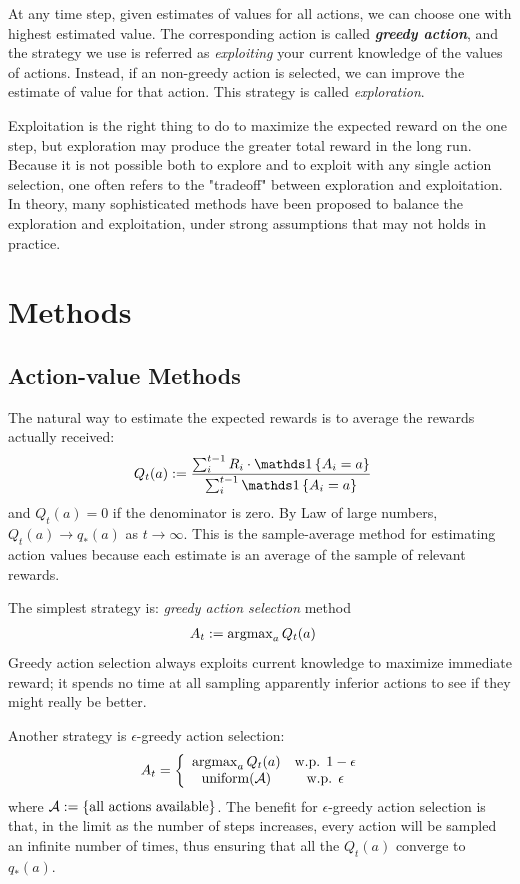 \documentclass[11pt]{article}
\begin{document}
At any time step, given estimates of values for all actions, we can choose one with highest estimated value. The corresponding action is called \emph{\textbf{greedy action}}, and the strategy we use is referred as \emph{exploiting} your current knowledge of the values of actions. Instead, if an non-greedy action is selected, we can improve the estimate of value for that action. This strategy is called \emph{exploration}. 

Exploitation is the right thing to do to maximize the expected reward on the one step, but exploration may produce the greater total reward in the long run.  Because it is not possible both to explore and to exploit with any single action selection, one often refers to the "tradeoff" between exploration and exploitation.  In theory, many sophisticated methods have been proposed to balance the exploration and exploitation, under strong assumptions that may not holds in practice. %

\section{Methods}
\subsection{Action-value Methods}
The natural way to estimate the expected rewards is to average the rewards actually received: 
\begin{align}
Q_t(a) &:= \frac{\sum_{i}^{t-1} R_i \cdot \ind{A_i = a}}{\sum_i^{t-1} \ind{A_i = a}} \label{eqn: action_val_methods}
\end{align} and $Q_t(a) = 0$ if the denominator is zero. By Law of large numbers, $Q_t(a) \rightarrow q_*(a)$ as $t\rightarrow \infty$.  This is the sample-average method for estimating action values because each estimate is an average of the sample of relevant rewards.

The simplest strategy is: \emph{greedy action selection} method
\begin{align}
A_t &:= \operatorname{argmax}_{a}Q_t(a) \label{expr: greedy_action_selection}
\end{align} Greedy action selection always exploits current knowledge to maximize immediate reward; it spends no time at all sampling apparently inferior actions to see if they might really be better.

Another strategy is $\epsilon$-greedy action selection:
\begin{align}
A_t &= \left\{\begin{array}{cc}
 \operatorname{argmax}_{a}Q_t(a)  & \text{w.p. } 1- \epsilon \\ 
 \text{uniform}({\mathcal A}) & \text{w.p. } \epsilon
\end{array}\right. \label{expr: eps-greedy_action_selection}
\end{align} where ${\mathcal A}: =\left\{\text{all actions available}\right\}$. The benefit for $\epsilon$-greedy action selection is that, in the limit as the number of steps increases, every action will be sampled an infinite number of times, thus ensuring that all the $Q_t(a)$ converge to $q_*(a)$.
\end{document}
